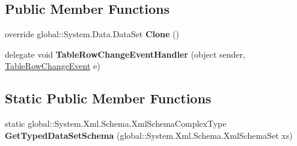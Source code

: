 \subsection*{Public Member Functions}
\begin{DoxyCompactItemize}
\item 
\mbox{\label{classprojekt__grupowy_1_1database_data_set_aa22e2e2ac4597000732359cffed9cc7e}} 
override global\+::\+System.\+Data.\+Data\+Set {\bfseries Clone} ()
\item 
\mbox{\label{classprojekt__grupowy_1_1database_data_set_aa2b7db7c2ea033ca442138077e1b1487}} 
delegate void {\bfseries Table\+Row\+Change\+Event\+Handler} (object sender, \hyperlink{classprojekt__grupowy_1_1database_data_set_1_1_table_row_change_event}{Table\+Row\+Change\+Event} e)
\end{DoxyCompactItemize}
\subsection*{Static Public Member Functions}
\begin{DoxyCompactItemize}
\item 
\mbox{\label{classprojekt__grupowy_1_1database_data_set_a74fd701414f69b67e5d610bb7d8cc897}} 
static global\+::\+System.\+Xml.\+Schema.\+Xml\+Schema\+Complex\+Type {\bfseries Get\+Typed\+Data\+Set\+Schema} (global\+::\+System.\+Xml.\+Schema.\+Xml\+Schema\+Set xs)
\end{DoxyCompactItemize}
